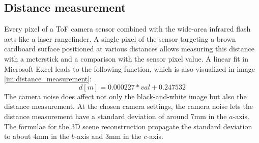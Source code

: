 \subsection{Distance measurement}
\label{sec:results_distance_meas}
Every pixel of a ToF camera sensor combined with the wide-area infrared flash acts like a laser rangefinder. A single pixel of the sensor targeting a brown cardboard surface positioned at various distances allows measuring this distance with a meterstick and a comparison with the sensor pixel value. A linear fit in Microsoft Excel leads to the following function, which is also visualized in image \ref{im:distance_measurement}:
\begin{equation*}
    d [m] = 0.000227 * val +0.247532
\end{equation*}
The camera noise does affect not only the black-and-white image but also the distance measurement. At the chosen camera settings, the camera noise lets the distance measurement have a standard deviation of around 7mm in the $a$-axis.\\
The formulae for the 3D scene reconstruction propagate the standard deviation to about 4mm in the $b$-axis and 3mm in the $c$-axis.
